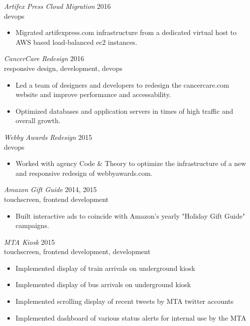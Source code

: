 \documentclass[line,margin]{res}
\begin{document}
\begin{resume}
    {\sl Artifex Press Cloud Migration}
    \hfill 2016 \\
    devops
    \begin{itemize} \itemsep -2pt
        \item
            Migrated artifexpress.com infrastructure from a dedicated virtual host to
            AWS based load-balanced ec2 instances. 
    \end{itemize}

    {\sl CancerCare Redesign}
    \hfill 2016 \\
    responsive design, development, devops
    \begin{itemize} \itemsep -2pt
        \item
            Led a team of designers and developers to redesign the cancercare.com website 
            and improve performance and accessability.
        \item
            Optimized databases and application servers in times of high traffic and overall
            growth.
    \end{itemize}

    {\sl Webby Awards Redesign}
    \hfill 2015 \\
    devops
    \begin{itemize} \itemsep -2pt
        \item
            Worked with agency Code & Theory to optimize the infrastructure of a new and responsive
            redesign of webbyawards.com. 
    \end{itemize}

    {\sl Amazon Gift Guide}
    \hfill 2014, 2015 \\
    touchscreen, frontend development
    \begin{itemize} \itemsep -2pt
        \item
            Built interactive ads to coincide with Amazon's yearly "Holiday Gift Guide" campaigns.
    \end{itemize}

    {\sl MTA Kiosk}
    \hfill 2015 \\
    touchscreen, frontend development, development
    \begin{itemize} \itemsep -2pt
        \item
            Implemented display of train arrivals on underground kiosk
        \item
            Implemented display of bus arrivals on underground kiosk
        \item
            Implemented scrolling display of recent tweets by MTA twitter accounts
        \item
            Implemented dashboard of various status alerts for internal use by the MTA
    \end{itemize}


\end{resume}
\end{document}
